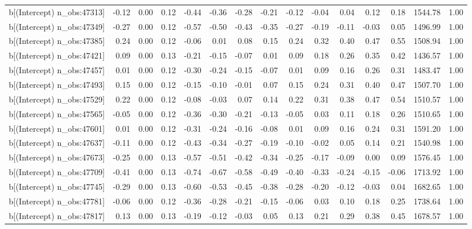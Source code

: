 \begin{table}[ht]
\begin{tabular}{rrrrrrrrrrrrrrr}
  b[(Intercept) n\_obs:47313] & -0.12 & 0.00 & 0.12 & -0.44 & -0.36 & -0.28 & -0.21 & -0.12 & -0.04 & 0.04 & 0.12 & 0.18 & 1544.78 & 1.00 \\ 
  b[(Intercept) n\_obs:47349] & -0.27 & 0.00 & 0.12 & -0.57 & -0.50 & -0.43 & -0.35 & -0.27 & -0.19 & -0.11 & -0.03 & 0.05 & 1496.99 & 1.00 \\ 
  b[(Intercept) n\_obs:47385] & 0.24 & 0.00 & 0.12 & -0.06 & 0.01 & 0.08 & 0.15 & 0.24 & 0.32 & 0.40 & 0.47 & 0.55 & 1508.94 & 1.00 \\ 
  b[(Intercept) n\_obs:47421] & 0.09 & 0.00 & 0.13 & -0.21 & -0.15 & -0.07 & 0.01 & 0.09 & 0.18 & 0.26 & 0.35 & 0.42 & 1436.57 & 1.00 \\ 
  b[(Intercept) n\_obs:47457] & 0.01 & 0.00 & 0.12 & -0.30 & -0.24 & -0.15 & -0.07 & 0.01 & 0.09 & 0.16 & 0.26 & 0.31 & 1483.47 & 1.00 \\ 
  b[(Intercept) n\_obs:47493] & 0.15 & 0.00 & 0.12 & -0.15 & -0.10 & -0.01 & 0.07 & 0.15 & 0.24 & 0.31 & 0.40 & 0.47 & 1507.70 & 1.00 \\ 
  b[(Intercept) n\_obs:47529] & 0.22 & 0.00 & 0.12 & -0.08 & -0.03 & 0.07 & 0.14 & 0.22 & 0.31 & 0.38 & 0.47 & 0.54 & 1510.57 & 1.00 \\ 
  b[(Intercept) n\_obs:47565] & -0.05 & 0.00 & 0.12 & -0.36 & -0.30 & -0.21 & -0.13 & -0.05 & 0.03 & 0.11 & 0.18 & 0.26 & 1510.65 & 1.00 \\ 
  b[(Intercept) n\_obs:47601] & 0.01 & 0.00 & 0.12 & -0.31 & -0.24 & -0.16 & -0.08 & 0.01 & 0.09 & 0.16 & 0.24 & 0.31 & 1591.20 & 1.00 \\ 
  b[(Intercept) n\_obs:47637] & -0.11 & 0.00 & 0.12 & -0.43 & -0.34 & -0.27 & -0.19 & -0.10 & -0.02 & 0.05 & 0.14 & 0.21 & 1540.98 & 1.00 \\ 
  b[(Intercept) n\_obs:47673] & -0.25 & 0.00 & 0.13 & -0.57 & -0.51 & -0.42 & -0.34 & -0.25 & -0.17 & -0.09 & 0.00 & 0.09 & 1576.45 & 1.00 \\ 
  b[(Intercept) n\_obs:47709] & -0.41 & 0.00 & 0.13 & -0.74 & -0.67 & -0.58 & -0.49 & -0.40 & -0.33 & -0.24 & -0.15 & -0.06 & 1713.92 & 1.00 \\ 
  b[(Intercept) n\_obs:47745] & -0.29 & 0.00 & 0.13 & -0.60 & -0.53 & -0.45 & -0.38 & -0.28 & -0.20 & -0.12 & -0.03 & 0.04 & 1682.65 & 1.00 \\ 
  b[(Intercept) n\_obs:47781] & -0.06 & 0.00 & 0.12 & -0.36 & -0.28 & -0.21 & -0.15 & -0.06 & 0.03 & 0.10 & 0.18 & 0.25 & 1738.64 & 1.00 \\ 
  b[(Intercept) n\_obs:47817] & 0.13 & 0.00 & 0.13 & -0.19 & -0.12 & -0.03 & 0.05 & 0.13 & 0.21 & 0.29 & 0.38 & 0.45 & 1678.57 & 1.00 \\ 

\end{tabular}
\end{table}
